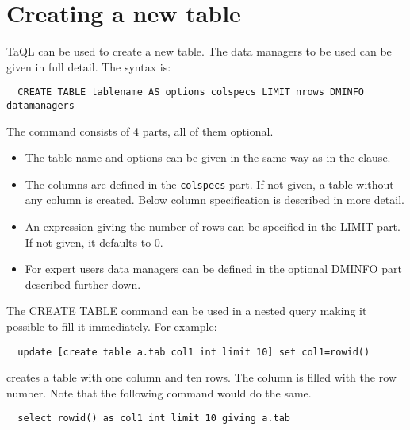 \section{\label{TAQL:CREATETABLE}Creating a new table}
TaQL can be used to create a new table. The data managers to be used
can be given in full detail.
The syntax is:
\begin{verbatim}
  CREATE TABLE tablename AS options colspecs LIMIT nrows DMINFO datamanagers
\end{verbatim}
The command consists of 4 parts, all of them optional.
\begin{itemize}
  \item The table name and options can be given in the same way as in the
     clause.
  \item The columns are defined in the \texttt{colspecs} part. If not given, a
    table without any column is created. Below column specification is
    described in more detail. 
  \item An expression giving the number of rows can be specified in
    the LIMIT part. If not given, it defaults to 0.
  \item  For expert users data managers can be defined in the optional
    DMINFO part described further down.
\end{itemize}

The CREATE TABLE command can be used in a nested query making it
possible to fill it immediately. For example:
\begin{verbatim}
  update [create table a.tab col1 int limit 10] set col1=rowid()
\end{verbatim}
creates a table with one column and ten rows. The column is filled
with the row number. Note that the following command would do the same.
\begin{verbatim}
  select rowid() as col1 int limit 10 giving a.tab
\end{verbatim}

